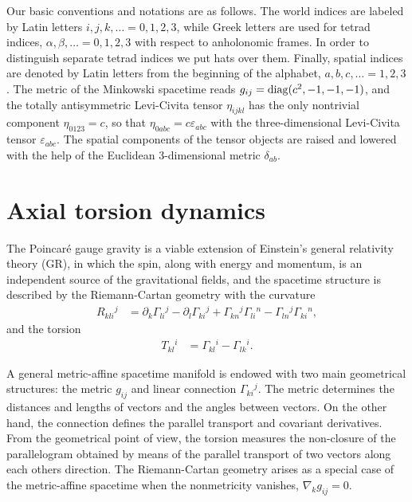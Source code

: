\documentclass[12pt,prd,showkeys,amsmath,amssymb,nofootinbib]{revtex4-1}
\begin{document}
Our basic conventions and notations are as follows. The world indices are labeled by Latin letters $i,j,k,\ldots = 0,1,2,3$, while Greek letters are used for tetrad indices, $\alpha,\beta,\ldots = 0,1,2,3$ with respect to anholonomic frames. In order to distinguish separate tetrad indices we put hats over them. Finally, spatial indices are denoted by Latin letters from the beginning of the alphabet, $a,b,c,\ldots = 1,2,3$. The metric of the Minkowski spacetime reads $g_{ij} = {\rm diag}(c^2, -1, -1, -1)$, and the totally antisymmetric Levi-Civita tensor $\eta_{ijkl}$ has the only nontrivial component $\eta_{0123} = c$, so that $\eta_{0abc} = c\varepsilon_{abc}$ with the three-dimensional Levi-Civita tensor $\varepsilon_{abc}$. The spatial components of the tensor objects are raised and lowered with the help of the Euclidean 3-dimensional metric $\delta_{ab}$.


\section{Axial torsion dynamics}


The Poincar\'e gauge gravity \cite{HEHL19951,doi:10.1142/S021988780600103X,doi:10.1142/S0219887818400054} is a viable extension of Einstein's general relativity theory (GR), in which the spin, along with energy and momentum, is an independent source of the gravitational fields, and the spacetime structure is described by the Riemann-Cartan geometry with the curvature 
\begin{align}\label{curv}
R_{kli}{}^j &= \partial_k\Gamma_{li}{}^j - \partial_l\Gamma_{ki}{}^j
+ \Gamma_{kn}{}^j \Gamma_{li}{}^n - \Gamma_{ln}{}^j\Gamma_{ki}{}^n,
\end{align}
and the torsion 
\begin{align}\label{tors}
  T_{kl}{}^i &= \Gamma_{kl}{}^i - \Gamma_{lk}{}^i.
\end{align}

A general metric-affine spacetime manifold is endowed with two main geometrical structures: the metric $g_{ij}$ and linear connection $\Gamma_{ki}{}^j$. The metric determines the distances and lengths of vectors and the angles between vectors. On the other hand, the connection defines the parallel transport and covariant derivatives. From the geometrical point of view, the torsion measures the non-closure of the parallelogram obtained by means of the parallel transport of two vectors along each others direction. The Riemann-Cartan geometry arises as a special case of the metric-affine spacetime when the nonmetricity vanishes, $\nabla_k g_{ij} = 0$. 
\end{document}
